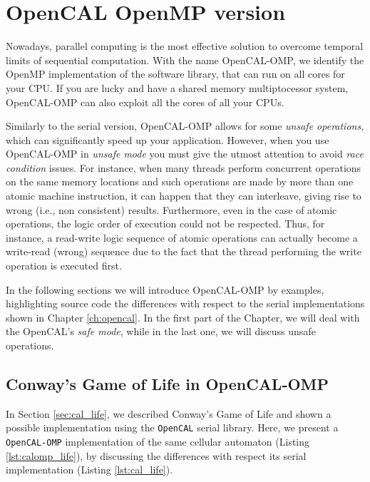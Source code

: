 \chapter{OpenCAL OpenMP version}\label{ch:opencal-omp}

Nowadays, parallel computing is the most effective solution to overcome temporal limits of sequential computation. 
With the name OpenCAL-OMP, we identify the OpenMP implementation of
the software library, that can run on all cores for your CPU. If
you are lucky and have a shared memory multiptocessor system,
OpenCAL-OMP can also exploit all the cores of all your CPUs.

Similarly to the serial version, OpenCAL-OMP allows for some
\emph{unsafe operations}, which can significantly speed up your
application. However, when you use OpenCAL-OMP in \emph{unsafe mode}
you must give the utmost attention to avoid\textsl{ race condition} issues. For
instance, when many threads perform concurrent operations on the same
memory locations and such operations are made by more than one atomic
machine instruction, it can happen that they can interleave, giving rise to
wrong (i.e., non consistent) results. Furthermore, even in the case of atomic operations, the
logic order of execution could not be respected. Thus, for instance, a
read-write logic sequence of atomic operations can actually become a
write-read (wrong) sequence due to the fact that the thread performing
the write operation is executed first.

In the following sections we will introduce OpenCAL-OMP by examples,
highlighting source code the differences with respect to the serial
implementations shown in Chapter \ref{ch:opencal}. In the first part of
the Chapter, we will deal with the OpenCAL's \emph{safe mode}, while in
the last one, we will discuss unsafe operations.

\section{Conway's Game of Life in OpenCAL-OMP}

In Section \ref{sec:cal_life}, we described Conway's Game of Life and
shown a possible implementation using the \verb'OpenCAL' serial
library. Here, we present a \verb'OpenCAL-OMP' implementation of the
same cellular automaton (Listing \ref{lst:calomp_life}), by discussing
the differences with respect its serial implementation (Listing
\ref{lst:cal_life}).



